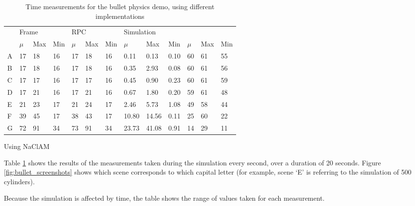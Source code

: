 \begin{table}[h]
\begin{subtable}[h]{\textwidth}
\begin{tabular}{l|lll|lll|lll|lll}
                       & \multicolumn{3}{l|}{Frame} & \multicolumn{3}{l|}{RPC} & \multicolumn{3}{l|}{Simulation} & \multicolumn{3}{l|}{}                     \\ \cline{2-13} 
                       & $\mu$     & Max     & Min     & $\mu$     & Max    & Min    & $\mu$       & Max       & Min      & $\mu$          & Max          & Min          \\ \hline
A                      & 17       & 18     & 16     & 17       & 18    & 16    & 0.11       & 0.13     & 0.10    & 60            & 61          & 55          \\
B                      & 17       & 18     & 16     & 17       & 18    & 16    & 0.35       & 2.93     & 0.08    & 60            & 61          & 56          \\
C                      & 17       & 17     & 16     & 17       & 17    & 16    & 0.45       & 0.90     & 0.23    & 60            & 61          & 59          \\
D                      & 17       & 21     & 16     & 17       & 21    & 16    & 0.67       & 1.80     & 0.20    & 59            & 61          & 48          \\
E                      & 21       & 23     & 17     & 21       & 24    & 17    & 2.46       & 5.73     & 1.08    & 49            & 58          & 44          \\
F                      & 39       & 45     & 17     & 38       & 43    & 17    & 10.80      & 14.56    & 0.11    & 25            & 60          & 22          \\
G                      & 72       & 91     & 34     & 73       & 91    & 34    & 23.73      & 41.08    & 0.91    & 14            & 29          & 11         
\end{tabular}
        \caption{Using NaClAM}
    \end{subtable}
\caption{Time measurements for the bullet physics demo, using different implementations}
\label{table:bullet_performance}
\end{table}


Table \ref{table:bullet_performance} shows the results of the measurements taken during the simulation every second, over a duration of 20 seconds. Figure \ref{fig:bullet_screenshots} shows which scene corresponds to which capital letter (for example, scene `E' is referring to the simulation of 500 cylinders).

Because the simulation is affected by time, the table shows the range of values taken for each measurement.

